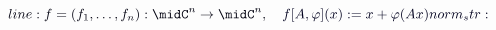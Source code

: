 \documentclass[12pt]{article}
\begin{document}
\makeatletter
\renewcommand*{\@textcolor}[3]{%
  \protect\leavevmode
  \begingroup
    \color#1{#2}#3%
  \endgroup
}
\makeatother
\begin{displaymath}
\mathcolor[RGB]{0,0,15}{line:
f=(f_1,\ldots,f_n):\midC^n\rightarrow\midC^n,} \quad \mathcolor[RGB]{0,0,30}{f[A,\varphi](x):=x+\varphi(Ax)

norm_str:}
\end{displaymath}
\end{document}
